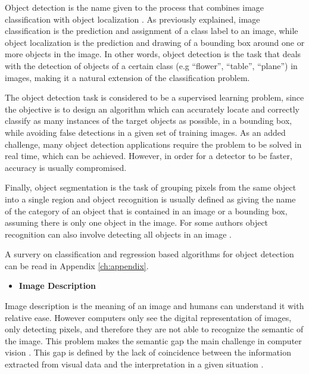     \par Object detection is the name given to the process that combines image classification with object localization \cite{ObjectDetection}. As previously explained, image classification is the prediction and assignment of a class label to an image, while object localization is the prediction and drawing of a bounding box around one or more objects in the image. In other words, object detection is the task that deals with the detection of objects of a certain class (e.g \enquote{flower}, \enquote{table}, \enquote{plane}) in images, making it a natural extension of the classification problem. 

    \par The object detection task is considered to be a supervised learning problem, since the objective is to design an algorithm which can accurately locate and correctly classify as many instances of the target objects as possible, in a bounding box, while avoiding false detections in a given set of training images.  As an added challenge, many object detection applications require the problem to be solved in real time, which can be achieved. However, in order for a detector to be faster, accuracy is usually compromised. 

    \par Finally, object segmentation is the task of grouping pixels from the same object into a single region and object recognition is usually defined as giving the name of the category of an object that is contained in an image or a bounding box, assuming there is only one object in the image. For some authors object recognition can also involve detecting all objects in an image \cite{Agarwal2019}.

    A survery on classification and regression based algorithms for object detection can be read in Appendix \ref{ch:appendix}.

 

    \begin{itemize}
        \item \textbf{Image Description}
    \end{itemize}


    \par Image description is the meaning of an image and humans can understand it with relative ease. However computers only see the digital representation of images, only detecting pixels, and therefore they are not able to recognize the semantic of the image. This problem makes the semantic gap the main challenge in computer vision \cite{Huang2012}. This gap is defined by the lack of coincidence between the information extracted from visual data and the interpretation in a given situation \cite{Agarwal2019}.
    


